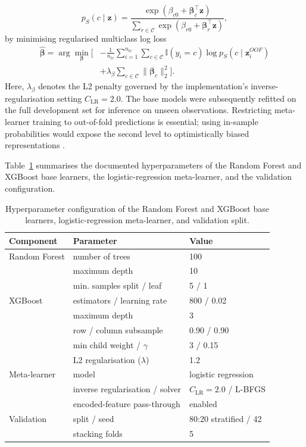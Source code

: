 \documentclass[a4paper,fleqn]{cas-dc}
\begin{document}
\begin{equation}
p_{S}(c\mid\mathbf{z})=
\frac{\exp(\beta_{c0}+\boldsymbol{\beta}_c^{\top}\mathbf{z})}
{\sum_{r\in\mathcal{C}}\exp(\beta_{r0}+\boldsymbol{\beta}_r^{\top}\mathbf{z})},
\label{eq:meta}
\end{equation}
by minimising regularised multiclass log loss
\begin{equation}
\begin{aligned}
\widehat{\boldsymbol{\beta}}=\arg\min_{\boldsymbol{\beta}}\Biggl[&
-\frac{1}{n_{tr}}\sum_{i=1}^{n_{tr}}\sum_{c\in\mathcal{C}}
\mathbb{I}(y_i=c)\log p_S(c\mid\mathbf{z}^{OOF}_i)\\
&+\lambda_{\beta}\sum_{c\in\mathcal{C}}\lVert\boldsymbol{\beta}_c\rVert_2^2\Biggr].
\end{aligned}
\label{eq:metaloss}
\end{equation}
Here, $\lambda_{\beta}$ denotes the L2 penalty governed by the implementation's inverse-regularisation setting $C_{\mathrm{LR}}=2.0$. The base models were subsequently refitted on the full development set for inference on unseen observations. Restricting meta-learner training to out-of-fold predictions is essential; using in-sample probabilities would expose the second level to optimistically biased representations \cite{kapoor2023,alabi2023}.

Table~\ref{tab:hyper} summarises the documented hyperparameters of the Random Forest and XGBoost base learners, the logistic-regression meta-learner, and the validation configuration.

\begin{table}[width=\textwidth,pos=!tbp]
\centering
\caption{Hyperparameter configuration of the Random Forest and XGBoost base learners, logistic-regression meta-learner, and validation split.}
\label{tab:hyper}
\small
\begin{tabular}{lll}
\toprule
Component & Parameter & Value \\
\midrule
Random Forest & number of trees & 100 \\
 & maximum depth & 10 \\
 & min. samples split / leaf & 5 / 1 \\
XGBoost & estimators / learning rate & 800 / 0.02 \\
 & maximum depth & 3 \\
 & row / column subsample & 0.90 / 0.90 \\
 & min child weight / $\gamma$ & 3 / 0.15 \\
 & L2 regularisation ($\lambda$) & 1.2 \\
Meta-learner & model & logistic regression \\
 & inverse regularisation / solver & $C_{\mathrm{LR}}=2.0$ / L-BFGS \\
 & encoded-feature pass-through & enabled \\
Validation & split / seed & 80:20 stratified / 42 \\
 & stacking folds & 5 \\
\bottomrule
\end{tabular}
\end{table}
\end{document}
